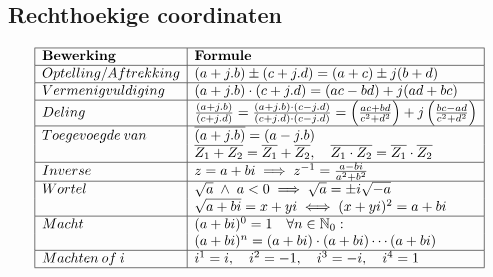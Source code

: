 \documentclass[a5paper]{article}
\begin{document}
\subsection{Rechthoekige coordinaten}
\[
\begin{array}{|l|l|}
\hline
\textbf{Bewerking} & \textbf{Formule} \\ \hline
Optelling/Aftrekking & (a + j.b) \pm (c + j.d) = (a + c) \pm j(b + d) \\ \hline
Vermenigvuldiging & (a + j.b) \cdot (c + j.d) = (ac - bd) + j(ad + bc) \\ \hline
Deling & 
\frac{(a + j.b)}{(c + j.d)} = \frac{(a + j.b) \cdot (c - j.d)}{(c + j.d) \cdot (c - j.d)} = \left( \frac{ac + bd}{c^2 + d^2} \right) + j \left( \frac{bc - ad}{c^2 + d^2} \right) \\ \hline
Toegevoegde\:van & \overline{(a + j.b)} = (a - j.b) \\
& \overline{Z_1 + Z_2} = \overline{Z_1} + \overline{Z_2}, \quad \overline{Z_1 \cdot Z_2} = \overline{Z_1} \cdot \overline{Z_2} \\ \hline
Inverse & z = a + bi \implies z^{-1} = \frac{a - bi}{a^2 + b^2} \\ \hline
Wortel & 
\sqrt{a} \; \wedge \; a < 0 \implies \sqrt{a} = \pm i\sqrt{-a} \\ 
& \sqrt{a + bi} = x + yi \iff (x + yi)^2 = a + bi \\ \hline
Macht & 
(a + bi)^0 = 1 \quad \forall n \in \mathbb{N}_0: \\
& (a + bi)^n = (a + bi) \cdot (a + bi) \cdots (a + bi) \\ \hline
Machten\:of\:i & i^1 = i, \quad i^2 = -1, \quad i^3 = -i, \quad i^4 = 1 \\ \hline
\end{array}
\]
\end{document}
